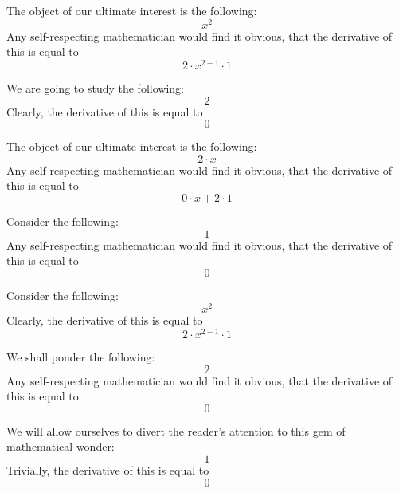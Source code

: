 \documentclass{article}
\begin{document}
The object of our ultimate interest is the following:
\begin{equation}
x ^{2 } 
\end{equation}
Any self-respecting mathematician would find it obvious, that the derivative of this is equal to
\begin{equation}
2 \cdot x ^{2 - 1 } \cdot 1 
\end{equation}

We are going to study the following:
\begin{equation}
2 
\end{equation}
Clearly, the derivative of this is equal to
\begin{equation}
0 
\end{equation}

The object of our ultimate interest is the following:
\begin{equation}
2 \cdot x 
\end{equation}
Any self-respecting mathematician would find it obvious, that the derivative of this is equal to
\begin{equation}
0 \cdot x + 2 \cdot 1 
\end{equation}

Consider the following:
\begin{equation}
1 
\end{equation}
Any self-respecting mathematician would find it obvious, that the derivative of this is equal to
\begin{equation}
0 
\end{equation}

Consider the following:
\begin{equation}
x ^{2 } 
\end{equation}
Clearly, the derivative of this is equal to
\begin{equation}
2 \cdot x ^{2 - 1 } \cdot 1 
\end{equation}

We shall ponder the following:
\begin{equation}
2 
\end{equation}
Any self-respecting mathematician would find it obvious, that the derivative of this is equal to
\begin{equation}
0 
\end{equation}

We will allow ourselves to divert the reader's attention to this gem of mathematical wonder:
\begin{equation}
1 
\end{equation}
Trivially, the derivative of this is equal to
\begin{equation}
0 
\end{equation}
\end{document}
